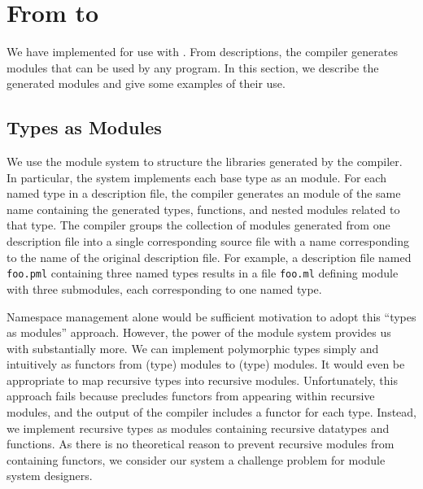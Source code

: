 \section{From \padsmlbig{} to \ocamlbig{}}
\label{sec:padsml-impl}
We have implemented \padsml{} for use with \ocaml{}. From
descriptions, the \padsml{} compiler generates \ocaml{} modules that
can be used by any \ocaml{} program. In this section, we describe the
generated modules and give some examples of their use.


\subsection{Types as Modules}
\label{sec:gen-code}
We use the \ocaml{} module system to structure the libraries generated
by the \padsml{} compiler.
In particular, the \padsml{} system implements each base type as an
\ocaml{} module.  
For each named type in a description file, the \padsml{} compiler
generates an \ocaml{} module of the same name containing the
generated types, functions, and nested modules related to that type. 
The compiler groups the collection of modules generated from one
description file  into a single corresponding \ocaml{} source file with a
name corresponding to the name of the original description file. For
example, a description file named \texttt{foo.pml} containing
three named types results in a file \texttt{foo.ml} defining
module  with three submodules, each corresponding to
one named type. 

Namespace management alone would be sufficient  
motivation to adopt this ``types as modules'' approach. However, the
power of the \ml{} module system provides us with substantially more.
We can implement polymorphic \padsml{} types simply
and intuitively as functors from (type) modules to (type) modules. It
would even be appropriate to map recursive \padsml{} types into recursive
modules. Unfortunately, this approach fails because \ocaml{}
precludes functors from appearing within recursive modules,
and the output of the \padsml{} compiler includes a functor for each
type.  Instead, we implement recursive types as modules
containing recursive datatypes and functions.
As there is no theoretical reason to prevent recursive modules from
containing functors\cite{???}, we consider our system a
challenge problem for module system designers.

